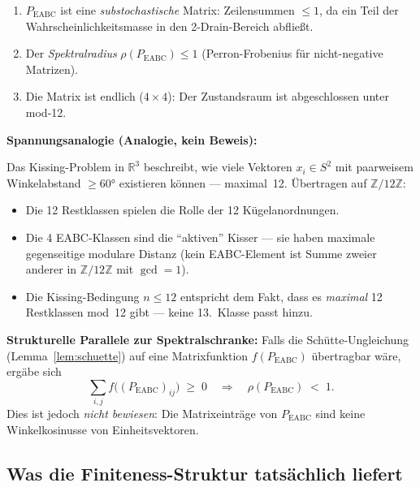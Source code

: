 \documentclass[12pt,a4paper]{article}
\newcommand{\Z}{\mathbb{Z}}
\newcommand{\R}{\mathbb{R}}
\newcommand{\ZmZ}{\Z/12\Z}
\begin{document}
\begin{tcolorbox}[ergebnis, title={Bekannte Fakten über $P_{\text{EABC}}$ -- bewiesen}]
\begin{enumerate}[noitemsep]
  \item $P_{\text{EABC}}$ ist eine \emph{substochastische} Matrix: Zeilensummen
        $\leq 1$, da ein Teil der Wahrscheinlichkeitsmasse in den
        2-Drain-Bereich abfließt.
  \item Der \emph{Spektralradius} $\rho(P_{\text{EABC}}) \leq 1$
        (Perron-Frobenius für nicht-negative Matrizen).
  \item Die Matrix ist endlich ($4 \times 4$): Der Zustandsraum ist
        abgeschlossen unter mod-12.
\end{enumerate}
\end{tcolorbox}

\begin{tcolorbox}[analogie]
\textbf{Spannungsanalogie (Analogie, kein Beweis):}

Das Kissing-Problem in $\R^3$ beschreibt, wie viele Vektoren $x_i \in S^2$
mit paarweisem Winkelabstand $\geq 60°$ existieren können --- maximal~12.
Übertragen auf $\ZmZ$:
\begin{itemize}[noitemsep]
  \item Die 12 Restklassen spielen die Rolle der 12 Kügelanordnungen.
  \item Die 4 EABC-Klassen sind die ``aktiven'' Kisser --- sie haben
        maximale gegenseitige modulare Distanz (kein EABC-Element ist
        Summe zweier anderer in $\Z/12\Z$ mit $\gcd = 1$).
  \item Die Kissing-Bedingung $n \leq 12$ entspricht dem Fakt, dass es
        \emph{maximal} 12 Restklassen mod~12 gibt --- keine 13.\ Klasse
        passt hinzu.
\end{itemize}

\medskip
\textbf{Strukturelle Parallele zur Spektralschranke:}
Falls die Schütte-Ungleichung (Lemma~\ref{lem:schuette}) auf eine
Matrixfunktion $f(P_{\text{EABC}})$ übertragbar wäre, ergäbe sich
\[
  \sum_{i,j} f\!\bigl((P_{\text{EABC}})_{ij}\bigr) \;\geq\; 0
  \quad \Longrightarrow \quad
  \rho(P_{\text{EABC}}) \;<\; 1.
\]
Dies ist jedoch \emph{nicht bewiesen}: Die Matrixeinträge von
$P_{\text{EABC}}$ sind keine Winkelkosinusse von Einheitsvektoren.
\end{tcolorbox}

\subsection{Was die Finiteness-Struktur tatsächlich liefert}
\end{document}
